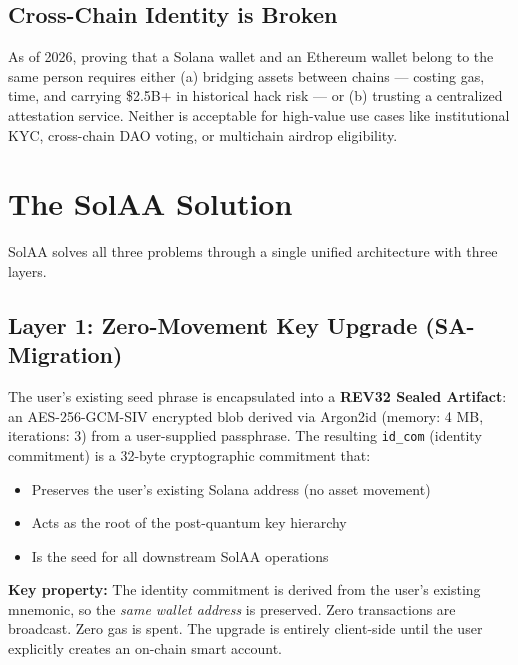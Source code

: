 \documentclass[11pt, a4paper]{article}
\begin{document}
\subsection{Cross-Chain Identity is Broken}

As of 2026, proving that a Solana wallet and an Ethereum wallet belong to the same person
requires either (a) bridging assets between chains --- costing gas, time, and carrying
\$2.5B+ in historical hack risk --- or (b) trusting a centralized attestation service.
Neither is acceptable for high-value use cases like institutional KYC, cross-chain DAO
voting, or multichain airdrop eligibility.

\section{The SolAA Solution}

SolAA solves all three problems through a single unified architecture with three layers.

\subsection{Layer 1: Zero-Movement Key Upgrade (SA-Migration)}

The user's existing seed phrase is encapsulated into a \textbf{REV32 Sealed Artifact}:
an AES-256-GCM-SIV encrypted blob derived via Argon2id (memory: 4 MB, iterations: 3)
from a user-supplied passphrase. The resulting \texttt{id\_com} (identity commitment) is
a 32-byte cryptographic commitment that:

\begin{itemize}
  \item Preserves the user's existing Solana address (no asset movement)
  \item Acts as the root of the post-quantum key hierarchy
  \item Is the seed for all downstream SolAA operations
\end{itemize}

\begin{greenbox}
  \textbf{Key property:} The identity commitment is derived from the user's existing
  mnemonic, so the \textit{same wallet address} is preserved. Zero transactions are
  broadcast. Zero gas is spent. The upgrade is entirely client-side until the user
  explicitly creates an on-chain smart account.
\end{greenbox}
\end{document}
